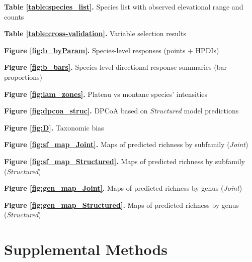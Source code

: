 \documentclass[preprint,final,times,12pt,3p]{elsarticle}
\begin{document}
\textbf{Table \ref{table:species_list}.} Species list with observed elevational range and counts

\textbf{Table \ref{table:cross-validation}.} Variable selection results

\textbf{Figure \ref{fig:b_byParam}.} Species-level responses (points + HPDIs)

\textbf{Figure \ref{fig:b_bars}.} Species-level directional response summaries (bar proportions)

\textbf{Figure \ref{fig:lam_zones}.} Plateau vs montane species' intensities

\textbf{Figure \ref{fig:dpcoa_struc}.} DPCoA based on \emph{Structured} model predictions

\textbf{Figure \ref{fig:D}.} Taxonomic bias

\textbf{Figure \ref{fig:sf_map_Joint}.} Maps of predicted richness by subfamily (\emph{Joint})

\textbf{Figure \ref{fig:sf_map_Structured}.} Maps of predicted richness by subfamily (\emph{Structured})

\textbf{Figure \ref{fig:gen_map_Joint}.} Maps of predicted richness by genus (\emph{Joint})

\textbf{Figure \ref{fig:gen_map_Structured}.} Maps of predicted richness by genus (\emph{Structured})



\newpage
\appendix

\section{Supplemental Methods}
\end{document}
